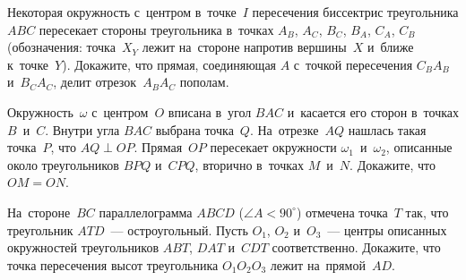 \begin{problems}
\item
Некоторая окружность с~центром в~точке~$I$ пересечения биссектрис
треугольника $ABC$ пересекает стороны треугольника
в~точках $A_{B}$, $A_{C}$, $B_{C}$, $B_{A}$, $C_{A}$, $C_{B}$
(обозначения: точка~$X_{Y}$ лежит на~стороне напротив вершины~$X$ и~ближе
к~точке~$Y$).
Докажите, что прямая, соединяющая $A$ с~точкой пересечения
$C_{B}A_{B}$ и~$B_{C}A_{C}$, делит отрезок~$A_{B}A_{C}$ пополам.


\item
Окружность~$\omega$ с~центром~$O$ вписана в~угол $BAC$ и~касается его сторон
в~точках $B$~и~$C$.
Внутри угла $BAC$ выбрана точка~$Q$.
На~отрезке~$AQ$ нашлась такая точка~$P$, что $AQ \perp OP$.
Прямая~$OP$ пересекает окружности $\omega_1$~и~$\omega_2$, описанные около
треугольников $BPQ$ и~$CPQ$, вторично в~точках $M$~и~$N$.
Докажите, что $OM = ON$.

\item
На~стороне~$BC$ параллелограмма $ABCD$ ($\angle A < 90^{\circ}$) отмечена
точка~$T$ так, что треугольник $ATD$~--- остроугольный.
Пусть $O_1$, $O_2$ и~$O_3$~--- центры описанных окружностей
треугольников $ABT$, $DAT$ и~$CDT$ соответственно.
Докажите, что точка пересечения высот треугольника $O_{1}O_{2}O_{3}$ лежит
на~прямой~$AD$.


\end{problems}

